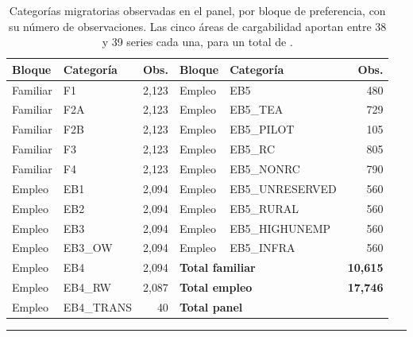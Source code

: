 \documentclass[12pt,letterpaper]{report}
\begin{document}
\begin{table}[H]
\centering
\footnotesize
\caption[Catálogo de dimensiones observadas]{Categorías migratorias observadas en el panel,
por bloque de preferencia, con su número de observaciones. Las cinco áreas de cargabilidad
aportan entre 38 y 39 series cada una, para un total de \factNSeriesStructural{}.}
\label{tab:catalogo}
\begin{tabular}{p{2.2cm}p{3.0cm}r p{2.2cm}p{3.1cm}r}
\toprule
\rowcolor{uacjblue!15}
\textbf{Bloque} & \textbf{Categoría} & \textbf{Obs.} & \textbf{Bloque} & \textbf{Categoría} & \textbf{Obs.} \\ \midrule
Familiar & F1  & 2{,}123 & Empleo & EB5            & 480 \\
Familiar & F2A & 2{,}123 & Empleo & EB5\_TEA       & 729 \\
Familiar & F2B & 2{,}123 & Empleo & EB5\_PILOT     & 105 \\
Familiar & F3  & 2{,}123 & Empleo & EB5\_RC        & 805 \\
Familiar & F4  & 2{,}123 & Empleo & EB5\_NONRC     & 790 \\
Empleo & EB1        & 2{,}094 & Empleo & EB5\_UNRESERVED & 560 \\
Empleo & EB2        & 2{,}094 & Empleo & EB5\_RURAL      & 560 \\
Empleo & EB3        & 2{,}094 & Empleo & EB5\_HIGHUNEMP  & 560 \\
Empleo & EB3\_OW    & 2{,}094 & Empleo & EB5\_INFRA      & 560 \\
Empleo & EB4        & 2{,}094 & \multicolumn{2}{l}{\textbf{Total familiar}} & \textbf{10{,}615} \\
Empleo & EB4\_RW    & 2{,}087 & \multicolumn{2}{l}{\textbf{Total empleo}}   & \textbf{17{,}746} \\
Empleo & EB4\_TRANS & 40      & \multicolumn{2}{l}{\textbf{Total panel}}    & \textbf{\factNObsFmt{}} \\
\bottomrule
\end{tabular}
\end{table}

\clearpage
\vspace*{0.4cm}
\noindent{\Large\bfseries\textcolor{uacjblue}{Acerca del autor y del asesor}}
\par\vspace{0.35cm}
\noindent\textcolor{uacjblue}{\rule{\textwidth}{0.6pt}}
\par\vspace{0.35cm}
\end{document}
